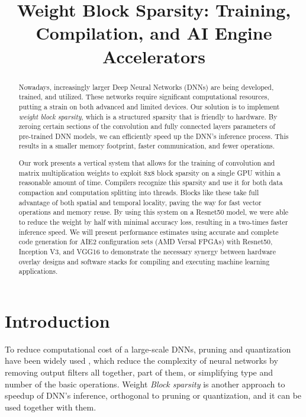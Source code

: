 \documentclass[conference]{IEEEtran}
\title{Weight Block Sparsity: Training, Compilation, and AI Engine Accelerators  }
\author{
  \IEEEauthorblockN{\IEEEauthorblockA{P. D'\!Alberto}}%
  \and
  \IEEEauthorblockN{\IEEEauthorblockA{T. Jeong      }}%
  \and
  \IEEEauthorblockN{\IEEEauthorblockA{A. Jain       }}%
  \and
  \IEEEauthorblockN{\IEEEauthorblockA{S. Manjunath  }}%
  \and
  \IEEEauthorblockN{\IEEEauthorblockA{M. Sarmah     }}%
  \and
  \IEEEauthorblockN{\IEEEauthorblockA{S. Hsu        }}%
  \and
  \IEEEauthorblockN{\IEEEauthorblockA{Y. Raparti    }}%
  \and
  \IEEEauthorblockN{\IEEEauthorblockA{N. Pipralia   }}%
}
\begin{document}
\maketitle
\thispagestyle{firstpage}
\pagestyle{plain}




\begin{abstract}

Nowadays, increasingly larger Deep Neural Networks (DNNs) are being
developed, trained, and utilized. These networks require significant
computational resources, putting a strain on both advanced and limited
devices. Our solution is to implement {\em weight block sparsity},
which is a structured sparsity that is friendly to hardware. By
zeroing certain sections of the convolution and fully connected layers
parameters of pre-trained DNN models, we can efficiently speed up the
DNN's inference process. This results in a smaller memory footprint,
faster communication, and fewer operations.

Our work presents a vertical system that allows for the training of
convolution and matrix multiplication weights to exploit 8x8 block
sparsity on a single GPU within a reasonable amount of time. Compilers
recognize this sparsity and use it for both data compaction and
computation splitting into threads. Blocks like these take full
advantage of both spatial and temporal locality, paving the way for
fast vector operations and memory reuse. By using this system on a
Resnet50 model, we were able to reduce the weight by half with minimal
accuracy loss, resulting in a two-times faster inference speed. We
will present performance estimates using accurate and complete code
generation for AIE2 configuration sets (AMD Versal FPGAs) with
Resnet50, Inception V3, and VGG16 to demonstrate the necessary synergy
between hardware overlay designs and software stacks for compiling and
executing machine learning applications.
\end{abstract}

\section{Introduction}

To reduce computational cost of a large-scale DNNs, pruning and
quantization have been widely used \cite{Jeong2020}, which reduce the
complexity of neural networks by removing output filters all together,
part of them, or simplifying type and number of the basic operations.
Weight {\em Block sparsity} is another approach to speedup of DNN's
inference, orthogonal to pruning or quantization, and it can be used
together with them.
  
\end{document}
